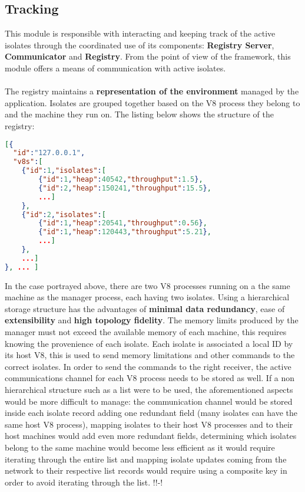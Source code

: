 \documentclass{l4proj}
\begin{document}
\subsection{Tracking} \label{Design:Tracking}
\hspace*{3em} This module is responsible with interacting and keeping track of the active isolates through the coordinated use of its components: \textbf{Registry Server}, \textbf{Communicator} and \textbf{Registry}. From the point of view of the framework, this module offers a means of communication with active isolates.
\\\\ %
\hspace*{3em} The registry maintains a \textbf{representation of the environment} managed by the application. Isolates are grouped together based on the V8 process they belong to and the machine they run on. The listing below shows the structure of the registry:
\begin{lstlisting}[language=json,firstnumber=1]
[{
  "id":"127.0.0.1",
  "v8s":[
  	{"id":1,"isolates":[
  		{"id":1,"heap":40542,"throughput":1.5},
  		{"id":2,"heap":150241,"throughput":15.5},
		...]
	},
  	{"id":2,"isolates":[
		{"id":1,"heap":20541,"throughput":0.56},
        {"id":1,"heap":120443,"throughput":5.21},
		...]
	},
	...]
}, ... ]
\end{lstlisting}
In the case portrayed above, there are two V8 processes running on a the same machine as the manager process, each having two isolates. Using a hierarchical storage structure has the advantages of \textbf{minimal data redundancy}, ease of \textbf{extensibility} and \textbf{high topology fidelity}. The memory limits produced by the manager must not exceed the available memory of each machine, this requires knowing the provenience of each isolate. Each isolate is associated a local ID by its host V8, this is used to send memory limitations and other commands to the correct isolates. In order to send the commands to the right receiver, the active communications channel for each V8 process needs to be stored as well. If a non hierarchical structure such as a list were to be used, the aforementioned aspects would be more difficult to manage: the communication channel would be stored inside each isolate record adding one redundant field (many isolates can have the same host V8 process), mapping isolates to their host V8 processes and to their host machines would add even more redundant fields, determining which isolates belong to the same machine would become less efficient as it would require iterating through the entire list and mapping isolate updates coming from the network to their respective list records would require using a composite key in order to avoid iterating through the list. !!-!
\end{document}
